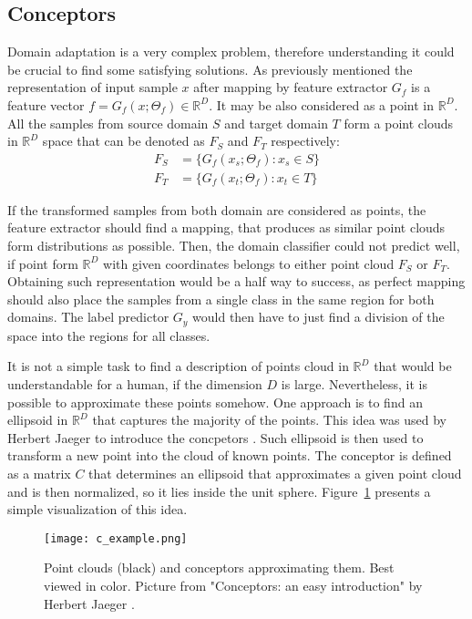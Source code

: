 \documentclass{article}
\begin{document}
\subsection{Conceptors}
Domain adaptation is a very complex problem, therefore understanding it could be crucial to find some satisfying solutions. As previously mentioned the representation of input sample $x$ after mapping by feature extractor $G_{f}$ is a feature vector $f = G_{f}(x ; \Theta_{f}) \in \mathbb{R}^{D}$. It may be also considered as a point in $\mathbb{R}^{D}$. All the samples from source domain $S$ and target domain $T$ form a point clouds in $\mathbb{R}^{D}$ space that can be denoted as $F_{S}$ and $F_{T}$ respectively:
\begin{align*}
    F_{S} &= \{ G_{f}(x_{s} ; \Theta_{f}) : x_{s} \in S  \} \\
    F_{T} &= \{ G_{f}(x_{t} ; \Theta_{f}) : x_{t} \in T  \}
\end{align*}
\par
If the transformed samples from both domain are considered as points, the feature extractor should find a mapping, that produces as similar point clouds form distributions as possible. Then, the domain classifier could not predict well, if point form $\mathbb{R}^{D}$ with given coordinates belongs to either point cloud $F_{S}$ or $F_{T}$. Obtaining such representation would be a half way to success, as perfect mapping should also place the samples from a single class in the same region for both domains. The label predictor $G_{y}$ would then have to just find a division of the space into the regions for all classes.
\par
It is not a simple task to find a description of points cloud in $\mathbb{R}^{D}$ that would be understandable for a human, if the dimension $D$ is large. Nevertheless, it is possible to approximate these points somehow. One approach is to find an ellipsoid in $\mathbb{R}^{D}$ that captures the majority of the points. This idea was used by Herbert Jaeger to introduce the concpetors \cite{conc}. Such ellipsoid is then used to transform a new point into the cloud of known points. The conceptor is defined as a matrix $C$ that determines an ellipsoid that approximates a given point cloud and is then normalized, so it lies inside the unit sphere. Figure~\ref{fig:conceptor_intro} presents a simple visualization of this idea.
\begin{figure}%
    \centering
    \texttt{[image: c\_example.png]}%
    \caption{Point clouds (black) and conceptors approximating them. Best viewed in color. Picture from "Conceptors: an easy introduction" by Herbert Jaeger \cite{conc_int}. }
    \label{fig:conceptor_intro}%
\end{figure}
\end{document}
